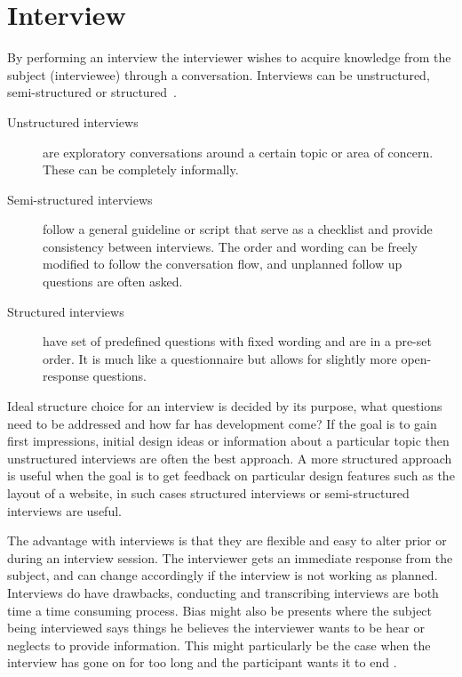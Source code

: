 \section{Interview}
By performing an interview the interviewer wishes to acquire knowledge from the subject (interviewee) through a conversation. Interviews can be unstructured, semi-structured or structured~\cite{interactionDesign}.
\begin{description}
  \item[Unstructured interviews] are exploratory conversations around a certain topic or area of concern. These can be completely informally.
  \item[Semi-structured interviews] follow a general guideline or script that serve as a checklist and provide consistency between interviews. The order and wording can be freely modified to follow the conversation flow, and unplanned follow up questions are often asked.
  \item[Structured interviews] have set of predefined questions with fixed wording and are in a pre-set order. It is much like a questionnaire but allows for slightly more open-response questions.
\end{description}
Ideal structure choice for an interview is decided by its purpose, what questions need to be addressed and how far has development come? If the goal is to gain first impressions, initial design ideas or information about a particular topic then unstructured interviews are often the best approach. A more structured approach is useful when the goal is to get feedback on particular design features such as the layout of a website, in such cases  structured interviews or semi-structured interviews are useful.

The advantage with interviews is that they are flexible and easy to alter prior or during an interview session. The interviewer gets an immediate response from the subject, and can change accordingly if the interview is not working as planned. Interviews do have drawbacks, conducting and transcribing interviews are both time a time consuming process. Bias might also be presents where the subject being interviewed says things he believes the interviewer wants to be hear or neglects to provide information. This might particularly be the case when the interview has gone on for too long and the participant wants it to end \cite{realWorldResearch}.

